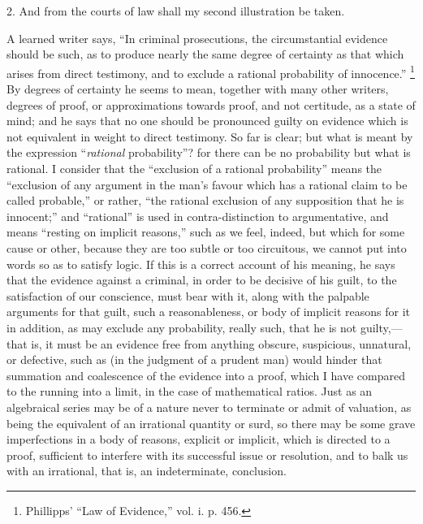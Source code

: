 2. And from the courts of law shall my second illustration be
taken.

A learned writer says, ``In criminal prosecutions, the
circumstantial evidence should be such, as to produce nearly the same
degree of certainty as that which arises from direct testimony, and to
exclude a rational probability of innocence.'' \footnote{Phillipps'
``Law of Evidence,'' vol. i. p. 456.} By degrees of certainty he seems to mean, together with many
other writers, degrees of proof, or approximations towards proof, and
not certitude, as a state of mind; and he says that no one should be
pronounced guilty on evidence which is not equivalent in weight to
direct testimony. So far is clear; but what is meant by the expression
``\emph{rational} probability''? for there can be no probability but
what is rational. I consider that the ``exclusion of a rational
probability'' means the ``exclusion of any argument in the man's
favour which has a rational claim to be called probable,'' or
rather, ``the rational exclusion of any supposition that he is
innocent;'' and ``rational'' is used in contra-distinction
to argumentative, and means ``resting on implicit reasons,''
such as we feel, indeed, but which for some cause or other, because
they are too subtle or too circuitous, we cannot put into words so as
to satisfy logic. If this is a correct account of his meaning, he says
that the evidence against a criminal, in order to be decisive of his
guilt, to the satisfaction of our conscience, must bear with it, along
with the palpable arguments for that guilt, such a reasonableness, or
body of implicit reasons for it in addition, as may exclude any
probability, really such, that he is not guilty,—that is, it must be
an evidence free from anything obscure, suspicious, unnatural,
or defective, such as (in the judgment of a prudent man) would hinder
that summation and coalescence of the evidence into a proof, which I
have compared to the running into a limit, in the case of mathematical
ratios. Just as an algebraical series may be of a nature never to
terminate or admit of valuation, as being the equivalent of an
irrational quantity or surd, so there may be some grave imperfections
in a body of reasons, explicit or implicit, which is directed to a
proof, sufficient to interfere with its successful issue or
resolution, and to balk us with an irrational, that is, an
indeterminate, conclusion.

